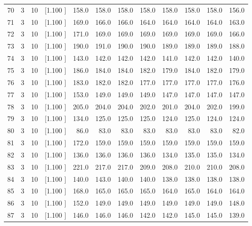 \documentclass[12pt,a4paper]{article}
\begin{document}
\begin{center}
{\begin{tabular}{r r r r r r r r r r r r}
  70&  3& 10&[1.100     ]&   158.0&   158.0&   158.0&   158.0&   158.0&   158.0&   158.0&   156.0\\[-0.02in]
  71&  3& 10&[1.100     ]&   169.0&   166.0&   166.0&   164.0&   164.0&   164.0&   164.0&   163.0\\[-0.02in]
  72&  3& 10&[1.100     ]&   171.0&   169.0&   169.0&   169.0&   169.0&   169.0&   169.0&   166.0\\[-0.02in]
  73&  3& 10&[1.100     ]&   190.0&   191.0&   190.0&   190.0&   189.0&   189.0&   189.0&   188.0\\[-0.02in]
  74&  3& 10&[1.100     ]&   143.0&   142.0&   142.0&   142.0&   141.0&   142.0&   142.0&   140.0\\[-0.02in]
  75&  3& 10&[1.100     ]&   186.0&   184.0&   184.0&   182.0&   179.0&   184.0&   182.0&   179.0\\[-0.02in]
  76&  3& 10&[1.100     ]&   183.0&   182.0&   182.0&   177.0&   177.0&   177.0&   177.0&   176.0\\[-0.02in]
  77&  3& 10&[1.100     ]&   153.0&   149.0&   149.0&   149.0&   147.0&   147.0&   147.0&   147.0\\[-0.02in]
  78&  3& 10&[1.100     ]&   205.0&   204.0&   204.0&   202.0&   201.0&   204.0&   202.0&   199.0\\[-0.02in]
  79&  3& 10&[1.100     ]&   134.0&   125.0&   125.0&   125.0&   124.0&   125.0&   124.0&   124.0\\[-0.02in]
  80&  3& 10&[1.100     ]&    86.0&    83.0&    83.0&    83.0&    83.0&    83.0&    83.0&    82.0\\[-0.02in]
  81&  3& 10&[1.100     ]&   172.0&   159.0&   159.0&   159.0&   159.0&   159.0&   159.0&   159.0\\[-0.02in]
  82&  3& 10&[1.100     ]&   136.0&   136.0&   136.0&   136.0&   134.0&   135.0&   135.0&   134.0\\[-0.02in]
  83&  3& 10&[1.100     ]&   221.0&   217.0&   217.0&   209.0&   208.0&   210.0&   210.0&   208.0\\[-0.02in]
  84&  3& 10&[1.100     ]&   140.0&   143.0&   140.0&   140.0&   138.0&   138.0&   138.0&   138.0\\[-0.02in]
  85&  3& 10&[1.100     ]&   168.0&   165.0&   165.0&   165.0&   164.0&   165.0&   164.0&   164.0\\[-0.02in]
  86&  3& 10&[1.100     ]&   152.0&   149.0&   149.0&   149.0&   149.0&   149.0&   149.0&   148.0\\[-0.02in]
  87&  3& 10&[1.100     ]&   146.0&   146.0&   146.0&   142.0&   142.0&   145.0&   145.0&   139.0\\[-0.02in]

\end{tabular}}
\end{center}
\end{document}
